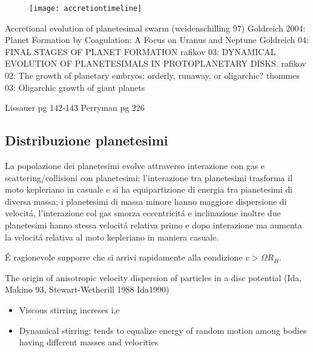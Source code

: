 \begin{workout}
\begin{figure}[!t]
\texttt{[image: accretiontimeline]}
\end{figure}

\begin{workout}
Accretional evolution of planetesimal swarm (weidenschilling 97)
Goldreich 2004: Planet Formation by Coagulation: A Focus on Uranus and Neptune
Goldreich 04: FINAL STAGES OF PLANET FORMATION
rafikov 03: DYNAMICAL EVOLUTION OF PLANETESIMALS IN PROTOPLANETARY DISKS.
rafikov 02: The growth of planetary embryos: orderly, runaway, or oligarchic?
thommes 03: Oligarchic growth of giant planets
\end{workout}

\begin{workout}[10m-10km, 100km-1000km, 1000km-10000km: refs]
Lissauer pg 142-143
Perryman pg 226
\end{workout}

\subsection{Distribuzione planetesimi}

La popolazione dei planetesimi evolve attraverso interazione con gas e scattering/collisioni con planetesimi: l'interazione tra planetesimi trasforma il moto kepleriano in casuale e si ha equipartizione di energia tra pianetesimi di diversa massa; i planetesimi di massa minore hanno maggiore dispersione di velocit\'a, l'interazione col gas smorza eccentricit\'a e inclinazione inoltre due planetesimi hanno stessa velocit\'a relativa primo e dopo interazione ma aumenta la velocit\'a relativa al moto kepleriano in maniera casuale.

\'E ragionevole supporre che si arrivi rapidamente alla condizione $v>\Omega R_H$.

\begin{workout}
The origin of anisotropic velocity dispersion of particles in a disc potential (Ida, Makino 93, Stewart-Wetherill 1988 Ida1990)
\end{workout}

\begin{workout}
\begin{itemize}
\item Viscous stirring increses i,e
\item Dynamical stirring: tends to equalize energy of random motion among bodies having different masses and velocities
\end{itemize}
\end{workout}


\end{workout}
